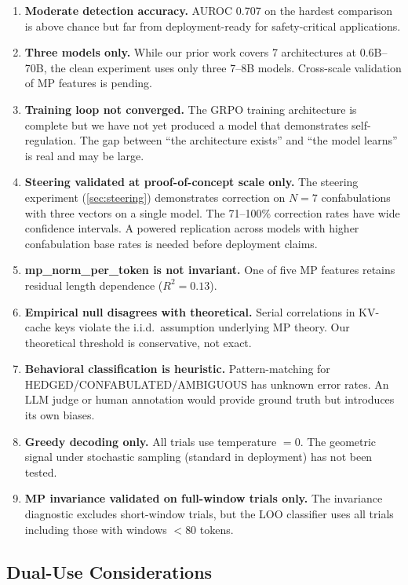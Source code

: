 \begin{enumerate}[nosep]
  \item \textbf{Moderate detection accuracy.} AUROC 0.707 on the hardest
    comparison is above chance but far from deployment-ready for
    safety-critical applications.
  \item \textbf{Three models only.} While our prior work covers 7
    architectures at 0.6B--70B, the clean experiment uses only three
    7--8B models. Cross-scale validation of MP features is pending.
  \item \textbf{Training loop not converged.} The GRPO training
    architecture is complete but we have not yet produced a model that
    demonstrates self-regulation. The gap between ``the architecture
    exists'' and ``the model learns'' is real and may be large.
  \item \textbf{Steering validated at proof-of-concept scale only.}
    The steering experiment (\cref{sec:steering}) demonstrates correction
    on $N = 7$ confabulations with three vectors on a single model.
    The 71--100\% correction rates have wide confidence intervals. A
    powered replication across models with higher confabulation base
    rates is needed before deployment claims.
  \item \textbf{mp\_norm\_per\_token is not invariant.} One of five MP
    features retains residual length dependence ($R^2 = 0.13$).
  \item \textbf{Empirical null disagrees with theoretical.} Serial
    correlations in KV-cache keys violate the i.i.d.\ assumption
    underlying MP theory. Our theoretical threshold is conservative,
    not exact.
  \item \textbf{Behavioral classification is heuristic.} Pattern-matching
    for HEDGED/CONFABULATED/AMBIGUOUS has unknown error rates. An LLM
    judge or human annotation would provide ground truth but introduces
    its own biases.
  \item \textbf{Greedy decoding only.} All trials use temperature $= 0$.
    The geometric signal under stochastic sampling (standard in deployment)
    has not been tested.
  \item \textbf{MP invariance validated on full-window trials only.}
    The invariance diagnostic excludes short-window trials, but the LOO
    classifier uses all trials including those with windows $< 80$ tokens.
\end{enumerate}

\subsection{Dual-Use Considerations}

